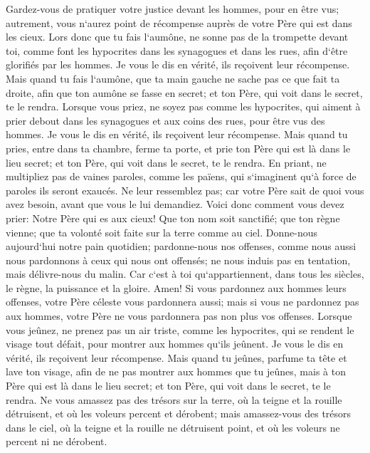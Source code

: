 \verse Gardez-vous de pratiquer votre justice devant les hommes, pour en être vus; autrement, vous n`aurez point de récompense auprès de votre Père qui est dans les cieux. 
\verse Lors donc que tu fais l`aumône, ne sonne pas de la trompette devant toi, comme font les hypocrites dans les synagogues et dans les rues, afin d`être glorifiés par les hommes. Je vous le dis en vérité, ils reçoivent leur récompense. 
\verse Mais quand tu fais l`aumône, que ta main gauche ne sache pas ce que fait ta droite, 
\verse afin que ton aumône se fasse en secret; et ton Père, qui voit dans le secret, te le rendra. 
\verse Lorsque vous priez, ne soyez pas comme les hypocrites, qui aiment à prier debout dans les synagogues et aux coins des rues, pour être vus des hommes. Je vous le dis en vérité, ils reçoivent leur récompense. 
\verse Mais quand tu pries, entre dans ta chambre, ferme ta porte, et prie ton Père qui est là dans le lieu secret; et ton Père, qui voit dans le secret, te le rendra. 
\verse En priant, ne multipliez pas de vaines paroles, comme les païens, qui s`imaginent qu`à force de paroles ils seront exaucés. 
\verse Ne leur ressemblez pas; car votre Père sait de quoi vous avez besoin, avant que vous le lui demandiez. 
\verse Voici donc comment vous devez prier: Notre Père qui es aux cieux! Que ton nom soit sanctifié; 
\verse que ton règne vienne; que ta volonté soit faite sur la terre comme au ciel. 
\verse Donne-nous aujourd`hui notre pain quotidien; 
\verse pardonne-nous nos offenses, comme nous aussi nous pardonnons à ceux qui nous ont offensés; 
\verse ne nous induis pas en tentation, mais délivre-nous du malin. Car c`est à toi qu`appartiennent, dans tous les siècles, le règne, la puissance et la gloire. Amen! 
\verse Si vous pardonnez aux hommes leurs offenses, votre Père céleste vous pardonnera aussi; 
\verse mais si vous ne pardonnez pas aux hommes, votre Père ne vous pardonnera pas non plus vos offenses. 
\verse Lorsque vous jeûnez, ne prenez pas un air triste, comme les hypocrites, qui se rendent le visage tout défait, pour montrer aux hommes qu`ils jeûnent. Je vous le dis en vérité, ils reçoivent leur récompense. 
\verse Mais quand tu jeûnes, parfume ta tête et lave ton visage, 
\verse afin de ne pas montrer aux hommes que tu jeûnes, mais à ton Père qui est là dans le lieu secret; et ton Père, qui voit dans le secret, te le rendra. 
\verse Ne vous amassez pas des trésors sur la terre, où la teigne et la rouille détruisent, et où les voleurs percent et dérobent; 
\verse mais amassez-vous des trésors dans le ciel, où la teigne et la rouille ne détruisent point, et où les voleurs ne percent ni ne dérobent. 
